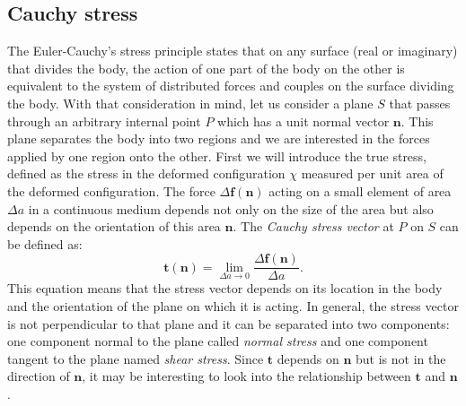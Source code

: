 	\subsection{Cauchy stress}\label{chap2:CauchyStress}
The Euler-Cauchy's stress principle states that on any surface (real or imaginary) that divides the body, the action of one part of the body on the other is equivalent to the system of distributed forces and couples on the surface dividing the body. With that consideration in mind, let us consider a plane $S$ that passes through an arbitrary internal point $P$ which has a unit normal vector $\mathbf{n}$. This plane separates the body into two regions and we are interested in the forces applied by one region onto the other. First we will introduce the true stress, defined as the stress in the deformed configuration $\chi$ measured per unit area of the deformed configuration. The force $\Delta\mathbf{f}(\mathbf{n})$ acting on a small element of area $\Delta a$ in a continuous medium depends not only on the size of the area but also depends on the orientation of this area $\mathbf{n}$. The \emph{Cauchy stress vector} at $P$ on $S$ can be defined as:
\begin{equation}
\mathbf{t}(\mathbf{n}) = \lim_{\Delta a \to 0} \frac{\Delta \mathbf{f}(\mathbf{n})}{\Delta a}.
\end{equation}
This equation means that the stress vector depends on its location in the body and the orientation of the plane on which it is acting. In general, the stress vector is not perpendicular to that plane and it can be separated into two components: one component normal to the plane called \emph{normal stress} and one component tangent to the plane named \emph{shear stress}. Since $\mathbf{t}$ depends on $\mathbf{n}$ but is not in the direction of $\mathbf{n}$, it may be interesting to look into the relationship between $\mathbf{t}$ and $\mathbf{n}$. 

